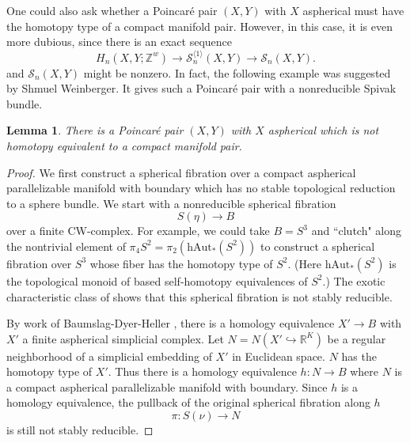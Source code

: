 \documentclass[12pt]{amsart}
\newtheorem{lemma}[theorem]{Lemma}
\theoremstyle{definition}
\newcommand{\R}{\mathbb R}
\newcommand{\Z}{\mathbb Z}
\newcommand{\cS}{\mathcal S}
\begin{document}
One could also ask whether a Poincar\'e pair $(X,Y)$ with $X$ aspherical must have the homotopy type of a compact manifold pair.   However, in this case, it is even more dubious, since there is an exact sequence
$$
H_n(X,Y;\Z^w ) \to \cS^{\langle 1 \rangle}_{n}(X,Y) \to \cS_{n}(X,Y).
$$
and $\cS_{n}(X,Y)$ might be nonzero.  In fact, the following example was 
suggested by Shmuel Weinberger.    It gives such a Poincar\'e pair with a nonreducible Spivak bundle.

\begin{lemma} \label{E_false_PP}
There is a Poincar\'e pair $(X,Y)$ with $X$ aspherical which is not homotopy equivalent to a compact manifold pair.   
\end{lemma}

\begin{proof}
We first construct a spherical fibration 
over a compact aspherical parallelizable manifold with boundary which has no stable topological reduction to a sphere bundle.   We start with a nonreducible spherical fibration
$$
S(\eta) \to B
$$
over a finite CW-complex.   For example, we could take $B= S^3$ and ``clutch" along the nontrivial element of $\pi_4S^2 = \pi_2(\text{hAut}_*(S^2))$ to construct a spherical fibration over $S^3$ whose fiber has the homotopy type of $S^2$.   (Here  $\text{hAut}_*(S^2)$ is the topological monoid of based self-homotopy equivalences of $S^2$.)  The exotic characteristic class of \cite{GS65} shows that this spherical fibration is not stably reducible.  

By work of Baumslag-Dyer-Heller \cite{BDH80}, there is a homology equivalence  $X' \to B$ with $X'$ a finite aspherical  simplicial complex.   Let $N = N(X' \hookrightarrow \R^K)$ be a regular neighborhood of a simplicial embedding of $X'$ in Euclidean space.   $N$ has the homotopy type of $X'$.    Thus there is a homology equivalence $h : N \to B$ where $N$ is a compact  aspherical parallelizable manifold with boundary.   Since $h$ is a homology equivalence, the pullback of the original spherical fibration along $h$ 
$$
\pi: S(\nu) \to N
$$
is still not stably reducible. 


\end{proof}
\end{document}
